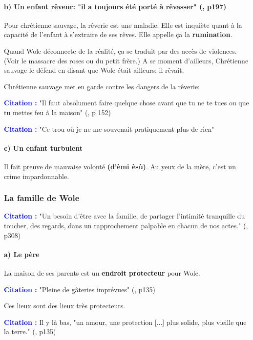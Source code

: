 \documentclass[a4paper, 11pt, hidelinks]{article}
\newcommand{\bs}{\bigskip}
\newcommand{\cit}{\large \textcolor{blue}{\textbf{Citation :}} \large }
\newcommand{\rb}[1]{\Romanbar{#1}}
\begin{document}
\paragraph{b) Un enfant rêveur: "il a toujours été porté à rêvasser" (\rb{7}, p197)}


Pour chrétienne sauvage, la rêverie est une maladie. Elle est inquiète quant à la capacité de l'enfant à s'extraire de ses rêves.
Elle appelle ça la \textbf{rumination}.

Quand Wole déconnecte de la réalité, ça se traduit par des accès de violences. (Voir le massacre des roses ou du petit frère.)
A se moment d'ailleurs, Chrétienne sauvage le défend en disant que Wole était ailleurs: il rêvait.


Chrétienne sauvage met en garde contre les dangers de la rêverie:

\cit "Il faut absolument faire quelque chose avant que tu ne te tues ou que tu mettes feu à la maison" (\rb{5}, p 152)


\cit "Ce trou où je ne me souvenait pratiquement plus de rien" 

\paragraph{c) Un enfant turbulent}



Il fait preuve de mauvaise volonté \textbf{(d'èmi èsù)}. Au yeux de la mère, c'est un crime impardonnable.


\subsubsection{La famille de Wole}


\cit "Un besoin d'être avec la famille, de partager l'intimité tranquille du toucher, des regards, dans un rapprochement palpable en chacun de nos actes." (\rb{11}, p308)


\paragraph{a) Le père}


La maison de ses parents est un \textbf{endroit protecteur} pour Wole.

\cit "Pleine de gâteries imprévues" (\rb{5}, p135)

\bs
Ces lieux sont des lieux très protecteurs. 

\cit Il y là bas, "un amour, une protection [...] plus solide, plus vieille que la terre." (\rb{5}, p135)
\end{document}
